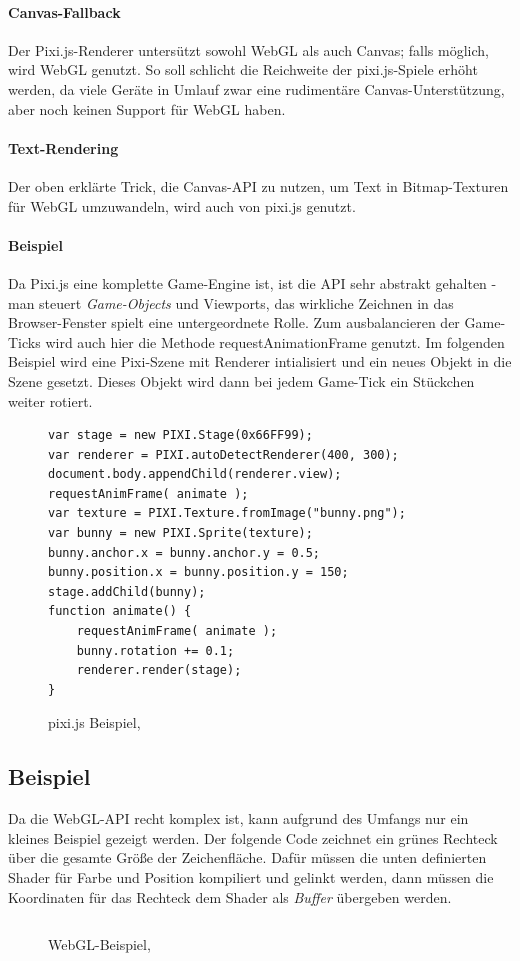 \documentclass[a4paper, 12pt]{article}
\begin{document}
\paragraph{Canvas-Fallback} Der Pixi.js-Renderer untersützt sowohl WebGL als auch Canvas; falls möglich, wird WebGL genutzt. So soll schlicht die Reichweite der pixi.js-Spiele erhöht werden, da viele Geräte in Umlauf zwar eine rudimentäre Canvas-Unterstützung, aber noch keinen Support für WebGL haben.\cite{PixiJS}
\paragraph{Text-Rendering} Der oben erklärte Trick, die Canvas-API zu nutzen, um Text in Bitmap-Texturen für WebGL umzuwandeln, wird auch von pixi.js genutzt.\cite{PixiJS}
\paragraph{Beispiel}
Da Pixi.js eine komplette Game-Engine ist, ist die API sehr abstrakt gehalten - man steuert \emph{Game-Objects} und Viewports, das wirkliche Zeichnen in das Browser-Fenster spielt eine untergeordnete Rolle. Zum ausbalancieren der Game-Ticks wird auch hier die Methode requestAnimationFrame genutzt.  Im folgenden Beispiel wird eine Pixi-Szene mit Renderer intialisiert und ein neues Objekt in die Szene gesetzt. Dieses Objekt wird dann bei jedem Game-Tick ein Stückchen weiter rotiert.
\begin{figure}[H]
	\begin{verbatim}
var stage = new PIXI.Stage(0x66FF99);
var renderer = PIXI.autoDetectRenderer(400, 300);
document.body.appendChild(renderer.view);
requestAnimFrame( animate );
var texture = PIXI.Texture.fromImage("bunny.png");
var bunny = new PIXI.Sprite(texture);
bunny.anchor.x = bunny.anchor.y = 0.5;
bunny.position.x = bunny.position.y = 150;
stage.addChild(bunny);
function animate() {
    requestAnimFrame( animate );
    bunny.rotation += 0.1;
    renderer.render(stage);
}
    \end{verbatim}
     \caption{pixi.js Beispiel, \cite{PixiJSExample}}
    \label{pixijs_example}
\end{figure}
\newpage
\subsection{Beispiel}
Da die WebGL-API recht komplex ist, kann aufgrund des Umfangs nur ein kleines Beispiel gezeigt werden. Der folgende Code zeichnet ein grünes Rechteck über die gesamte Größe der Zeichenfläche. Dafür müssen die unten definierten Shader für Farbe und Position kompiliert und gelinkt werden, dann müssen die Koordinaten für das Rechteck dem Shader als \emph{Buffer} übergeben werden.
\begin{figure}[H]
	\inputminted{javascript}{assets/vanillawebgl_example.js}
	\caption{WebGL-Beispiel, \cite{WebGLExample}}
	\label{webgl_example}
\end{figure}
\newpage
\end{document}
